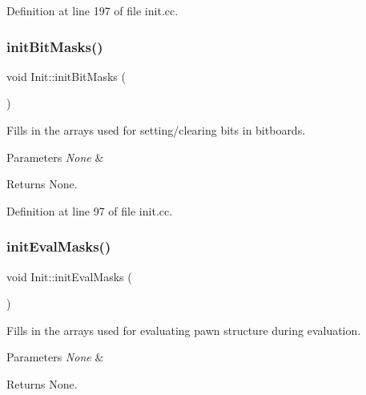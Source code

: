 Definition at line 197 of file init.\+cc.

\mbox{\label{namespaceInit_ae0ffdba0cdf68df3778883fc7d1d8a5f}} 
\subsubsection{\texorpdfstring{init\+Bit\+Masks()}{initBitMasks()}}
{\footnotesize\ttfamily void Init\+::init\+Bit\+Masks (\begin{DoxyParamCaption}{ }\end{DoxyParamCaption})\hspace{0.3cm}{\ttfamily [noexcept]}}



Fills in the arrays used for setting/clearing bits in bitboards. 


\begin{DoxyParams}{Parameters}
{\em None} & \\
\hline
\end{DoxyParams}
\begin{DoxyReturn}{Returns}
None. 
\end{DoxyReturn}


Definition at line 97 of file init.\+cc.

\mbox{\label{namespaceInit_a836df13b70275ee90841a157d0e380dd}} 
\subsubsection{\texorpdfstring{init\+Eval\+Masks()}{initEvalMasks()}}
{\footnotesize\ttfamily void Init\+::init\+Eval\+Masks (\begin{DoxyParamCaption}{ }\end{DoxyParamCaption})\hspace{0.3cm}{\ttfamily [noexcept]}}



Fills in the arrays used for evaluating pawn structure during evaluation. 


\begin{DoxyParams}{Parameters}
{\em None} & \\
\hline
\end{DoxyParams}
\begin{DoxyReturn}{Returns}
None. 
\end{DoxyReturn}


